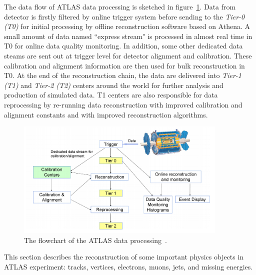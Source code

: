The data flow of ATLAS data processing is sketched in figure~\ref{fig:data_processing}. 
Data from detector is firstly filtered by online trigger system before sending to the \textit{Tier-0 (T0)} for initial processing by offline reconstruction software based on Athena.
A small amount of data named ``express stream" is processed in almost real time in T0 for online data quality monitoring.
In addition, some other dedicated data steams are sent out at trigger level for detector alignment and calibration.
These calibration and alignment information are then used for bulk reconstruction in T0.
At the end of the reconstruction chain, the data are delivered into \textit{Tier-1 (T1)} and \textit{Tier-2 (T2)} centers around the world for further analysis and production of simulated data.
T1 centers are also responsible for data reprocessing by re-running data reconstruction with improved calibration and alignment constants and with improved reconstruction algorithms.
\begin{figure}[!htb]
  \centering
  \includegraphics[width=0.9\textwidth]{figures/Simulation/data_processing.png}
  \caption{The flowchart of the ATLAS data processing~\cite{Boyd_2010}.}
  \label{fig:data_processing}
\end{figure}

This section describes the reconstruction of some important physics objects in ATLAS experiment: tracks, vertices, electrons, muons, jets, and missing energies.







